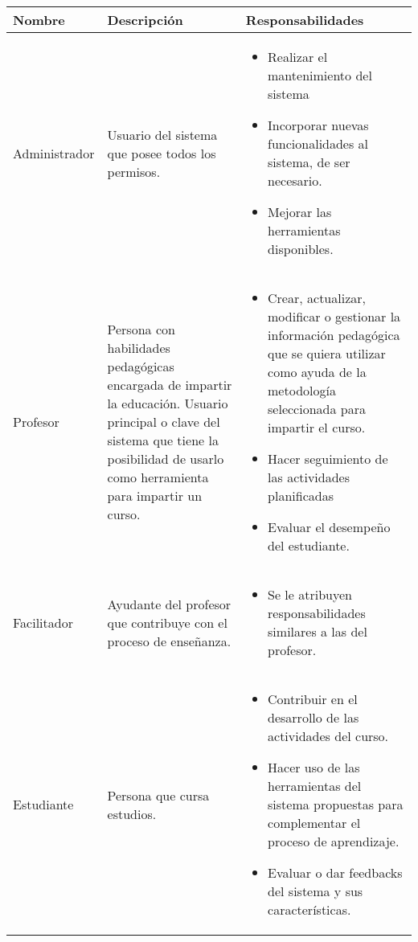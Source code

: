 \documentclass{article}
\begin{document}
	\begin{center}
		\begin{tabular}{| p{} | p{} | p{} |}
			\hline  %
			\raggedright
			Nombre & Descripción & Responsabilidades \\ \hline
 			Administrador &
			Usuario del sistema que posee todos los permisos. &
			\begin{itemize}
			\item Realizar el mantenimiento del sistema
			\item Incorporar nuevas funcionalidades al sistema, de ser necesario.
			\item Mejorar las herramientas disponibles.
			\end{itemize}
			\\ \hline	

			\raggedright
 			Profesor &
			Persona con habilidades pedagógicas encargada de impartir la educación. Usuario principal o clave del sistema que tiene la posibilidad de usarlo como herramienta para impartir un curso. &
			\begin{itemize}
			\item Crear, actualizar, modificar o gestionar la información pedagógica que se quiera utilizar como ayuda de la metodología seleccionada para impartir el curso.
			\item Hacer seguimiento de las actividades planificadas
			\item Evaluar el desempeño del estudiante.
			\end{itemize}
			\\ \hline	

			\raggedright
 			Facilitador &
			Ayudante del profesor que contribuye con el proceso de enseñanza. &
			\begin{itemize}
			\item Se le atribuyen responsabilidades similares a las del profesor.
			\end{itemize}
			\\ \hline	

			\raggedright
 			Estudiante &
			Persona que cursa estudios. &
			\begin{itemize}
			\item Contribuir en el desarrollo de las actividades del curso.
			\item Hacer uso de las herramientas del sistema propuestas para complementar el proceso de aprendizaje.
			\item Evaluar o dar feedbacks del sistema y sus características.
			\end{itemize}
			\\ \hline		
		
		\end{tabular}
	\end{center}
\end{document}
